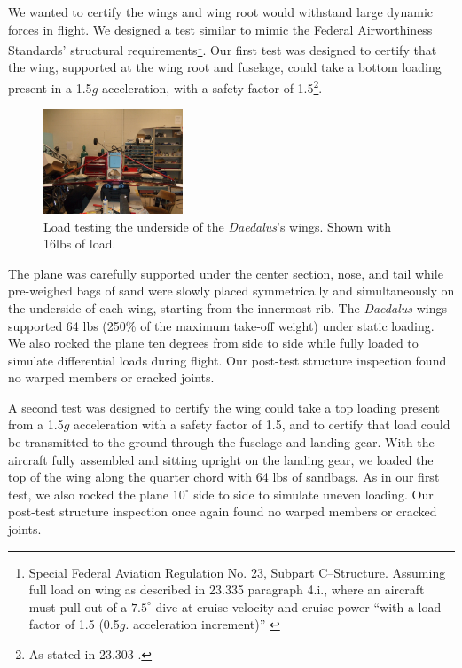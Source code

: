 \documentclass[10pt]{report}
\newcommand{\degrees}[1]
{
\begin{math}
#1^{\circ} 
\end{math}
}
\begin{document}
We wanted to certify the wings and wing root would withstand large dynamic forces in flight. 
We designed a test similar to mimic the 
Federal Airworthiness Standards' structural requirements\footnote{Special Federal Aviation Regulation No. 23, Subpart C--Structure. Assuming full load on wing as described in 23.335 paragraph 4.i., where an aircraft must pull out of a \degrees{7.5} dive at cruise velocity and cruise power ``with a load factor of 1.5 (0.5$g$. acceleration increment)'' \cite{far23}}. Our first test was designed to certify that the wing, supported at the wing root and fuselage, could take a bottom loading present in a 1.5$g$ acceleration, with a safety factor of 1.5\footnote{As stated in 23.303 \cite{far23}.}.

 \begin{figure}
	\includegraphics[width=0.37\textwidth]{../images/daedalus_sandbagtest.jpg}
	\caption{Load testing the underside of the \emph{Daedalus}'s wings. Shown with 16lbs of load.}
	\label{fig:sandbagtest}
\end{figure}
The plane was carefully supported under the center section, nose, and tail while pre-weighed bags of sand were slowly placed symmetrically and simultaneously on the underside of each wing, starting from the innermost rib.  The \emph{Daedalus} wings supported 64 lbs (250\% of the maximum take-off weight) under static loading.  We also rocked the plane ten degrees from side to side while fully loaded to simulate differential loads during flight. Our post-test structure inspection found no warped members or cracked joints.

A second test was designed to certify the wing could take a top loading present from a 1.5$g$ acceleration with a safety factor of 1.5, and to certify that load could be transmitted to the ground through the fuselage and landing gear. With the aircraft fully assembled and sitting upright on the landing gear, we loaded the top of the wing along the quarter chord with 64 lbs of sandbags. As in our first test, we also rocked the plane \degrees{10} side to side to simulate uneven loading. Our post-test structure inspection once again found no warped members or cracked joints.
\end{document}
